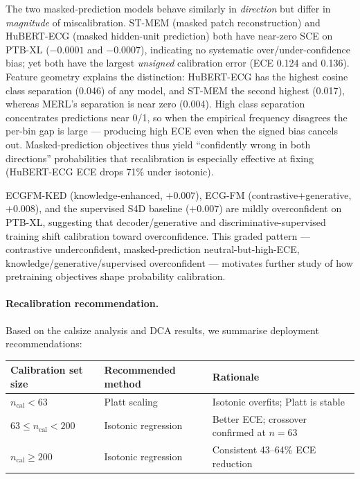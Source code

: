 The two masked-prediction models behave similarly in \emph{direction} but differ in
\emph{magnitude} of miscalibration. ST-MEM (masked patch reconstruction) and HuBERT-ECG
(masked hidden-unit prediction) both have near-zero SCE on PTB-XL ($-0.0001$ and $-0.0007$),
indicating no systematic over/under-confidence bias; yet both have the largest \emph{unsigned}
calibration error (ECE 0.124 and 0.136). Feature geometry explains the distinction: HuBERT-ECG
has the highest cosine class separation (0.046) of any model, and ST-MEM the second highest
(0.017), whereas MERL's separation is near zero (0.004). High class separation concentrates
predictions near 0/1, so when the empirical frequency disagrees the per-bin gap is large ---
producing high ECE even when the signed bias cancels out. Masked-prediction objectives thus
yield ``confidently wrong in both directions'' probabilities that recalibration is especially
effective at fixing (HuBERT-ECG ECE drops 71\% under isotonic).

ECGFM-KED (knowledge-enhanced, $+0.007$), ECG-FM (contrastive+generative, $+0.008$), and the
supervised S4D baseline ($+0.007$) are mildly overconfident on PTB-XL, suggesting that
decoder/generative and discriminative-supervised training shift calibration toward
overconfidence. This graded pattern --- contrastive underconfident, masked-prediction
neutral-but-high-ECE, knowledge/generative/supervised overconfident --- motivates further
study of how pretraining objectives shape probability calibration.

\paragraph{Recalibration recommendation.}
Based on the calsize analysis and DCA results, we summarise deployment recommendations:

\begin{center}
\begin{tabular}{lll}
\toprule
Calibration set size & Recommended method & Rationale \\
\midrule
$n_{\mathrm{cal}} < 63$      & Platt scaling          & Isotonic overfits; Platt is stable \\
$63 \leq n_{\mathrm{cal}} < 200$ & Isotonic regression    & Better ECE; crossover confirmed at $n=63$ \\
$n_{\mathrm{cal}} \geq 200$  & Isotonic regression    & Consistent 43--64\% ECE reduction \\
\bottomrule
\end{tabular}
\end{center}

